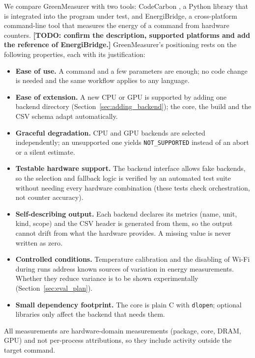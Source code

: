 We compare GreenMeasurer with two tools: CodeCarbon \cite{benoit_courty_2024_11171501}, a Python library that is integrated into the program under test, and EnergiBridge, a cross-platform command-line tool that measures the energy of a command from hardware counters. \textbf{[TODO: confirm the description, supported platforms and add the reference of EnergiBridge.]} GreenMeasurer's positioning rests on the following properties, each with its justification:

\begin{itemize}
    \item \textbf{Ease of use.} A command and a few parameters are enough; no code change is needed and the same workflow applies to any language.
    \item \textbf{Ease of extension.} A new CPU or GPU is supported by adding one backend directory (Section~\ref{sec:adding_backend}); the core, the build and the CSV schema adapt automatically.
    \item \textbf{Graceful degradation.} CPU and GPU backends are selected independently; an unsupported one yields \texttt{NOT\_SUPPORTED} instead of an abort or a silent estimate.
    \item \textbf{Testable hardware support.} The backend interface allows fake backends, so the selection and fallback logic is verified by an automated test suite without needing every hardware combination (these tests check orchestration, not counter accuracy).
    \item \textbf{Self-describing output.} Each backend declares its metrics (name, unit, kind, scope) and the CSV header is generated from them, so the output cannot drift from what the hardware provides. A missing value is never written as zero.
    \item \textbf{Controlled conditions.} Temperature calibration and the disabling of Wi-Fi during runs address known sources of variation in energy measurements. Whether they reduce variance is to be shown experimentally (Section~\ref{sec:eval_plan}).
    \item \textbf{Small dependency footprint.} The core is plain C with \texttt{dlopen}; optional libraries only affect the backend that needs them.
\end{itemize}

All measurements are hardware-domain measurements (package, core, DRAM, GPU) and not per-process attributions, so they include activity outside the target command.
